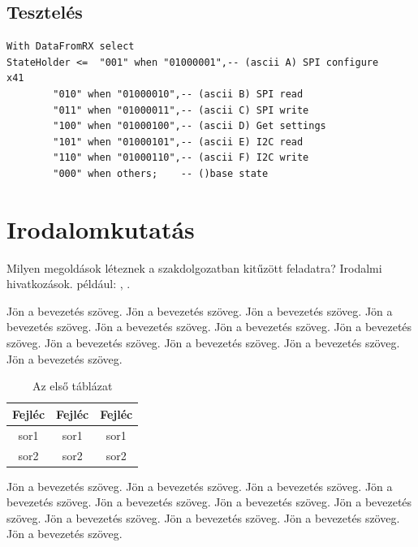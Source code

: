 \documentclass[a4paper,12pt,oneside]{book}
\begin{document}
\section{Tesztelés}

\iffalse
\begin{lstlisting}
With DataFromRX select
StateHolder <= 	"001" when "01000001",-- (ascii A) SPI configure	x41 
		"010" when "01000010",-- (ascii B) SPI read
		"011" when "01000011",-- (ascii C) SPI write
		"100" when "01000100",-- (ascii D) Get settings
		"101" when "01000101",-- (ascii E) I2C read
		"110" when "01000110",-- (ascii F) I2C write
		"000" when others;    -- ()base state
	\end{lstlisting}







\chapter{Irodalomkutatás}
Milyen megoldások léteznek a szakdolgozatban kitűzött feladatra? Irodalmi hivatkozások. például: \cite{b1}, \cite{htm}.


Jön a bevezetés szöveg. Jön a bevezetés szöveg. Jön a bevezetés szöveg. Jön a bevezetés szöveg. Jön a bevezetés szöveg. Jön a bevezetés szöveg. Jön a bevezetés szöveg. Jön a bevezetés szöveg. Jön a bevezetés szöveg. Jön a bevezetés szöveg. Jön a bevezetés szöveg.

\begin{table}[H]
	\centering \renewcommand{\arraystretch}{1.2}
	\caption{Az első táblázat}
	\begin{tabular}{|c|c|c|} \hline
		Fejléc&Fejléc&Fejléc\\ \hline
		sor1&sor1&sor1\\ \hline
		sor2&sor2&sor2\\ \hline	
	\end{tabular}
	\label{tabla1}
\end{table}

Jön a bevezetés szöveg. Jön a bevezetés szöveg. Jön a bevezetés szöveg. Jön a bevezetés szöveg. Jön a bevezetés szöveg. Jön a bevezetés szöveg. Jön a bevezetés szöveg. Jön a bevezetés szöveg. Jön a bevezetés szöveg. Jön a bevezetés szöveg. Jön a bevezetés szöveg.
\end{document}
